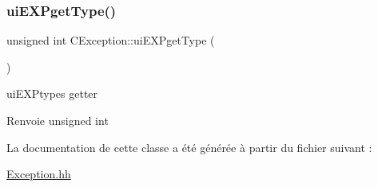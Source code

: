 \subsubsection{\texorpdfstring{ui\+E\+X\+Pget\+Type()}{uiEXPgetType()}}
{\footnotesize\ttfamily unsigned int C\+Exception\+::ui\+E\+X\+Pget\+Type (\begin{DoxyParamCaption}{ }\end{DoxyParamCaption})}



ui\+E\+X\+Ptype\textquotesingle{}s getter 

\begin{DoxyReturn}{Renvoie}
unsigned int 
\end{DoxyReturn}


La documentation de cette classe a été générée à partir du fichier suivant \+:\begin{DoxyCompactItemize}
\item 
\hyperlink{Exception_8hh}{Exception.\+hh}\end{DoxyCompactItemize}
